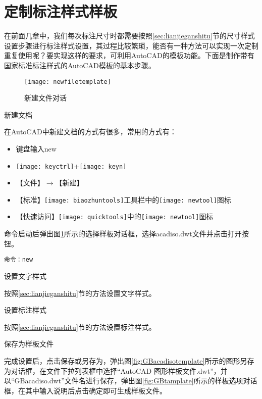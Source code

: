 \section{定制标注样式样板}
在前面几章中，我们每次标注尺寸时都需要按照\ref{sec:lianjieganshitu}节的尺寸样式设置步骤进行标注样式设置，其过程比较繁琐，能否有一种方法可以实现一次定制重复使用呢？要实现这样的要求，可利用AutoCAD的模板功能。下面是制作带有国家标准标注样式的AutoCAD模板的基本步骤。
\begin{figure}[htbp]
\centering
\texttt{[image: newfiletemplate]}
\caption{新建文件对话}\label{fig:newfiletemplate}
\end{figure}

\begin{procedure}
\item 新建文档

在AutoCAD中新建文档的方式有很多，常用的方式有：
\begin{itemize}
\item 键盘输入new
\item \texttt{[image: keyctrl]}+\texttt{[image: keyn]}
\item 【文件】$\rightarrow $【新建】
\item 【标准】\texttt{[image: biaozhuntools]}工具栏中的\texttt{[image: newtool]}图标
\item 【快速访问】\texttt{[image: quicktools]}中的\texttt{[image: newtool]}图标
\end{itemize}

命令启动后弹出图\ref{fig:newfiletemplate}所示的选择样板对话框，选择acadiso.dwt文件并点击打开按钮。



\begin{lstlisting}
命令：new
\end{lstlisting}

\item 设置文字样式

按照\ref{sec:lianjieganshitu}节的方法设置文字样式。

\item 设置标注样式

按照\ref{sec:lianjieganshitu}节的方法设置标注样式。

\item 保存为样板文件

完成设置后，点击保存或另存为，弹出图\ref{fig:GBacadisotemplate}所示的图形另存为对话框，在文件下拉列表框中选择“AutoCAD 图形样板文件.dwt”，并以“GBacadiso.dwt”文件名进行保存，弹出图\ref{fig:GBtamplate}所示的样板选项对话框，在其中输入说明后点击确定即可生成样板文件。



\end{procedure}
